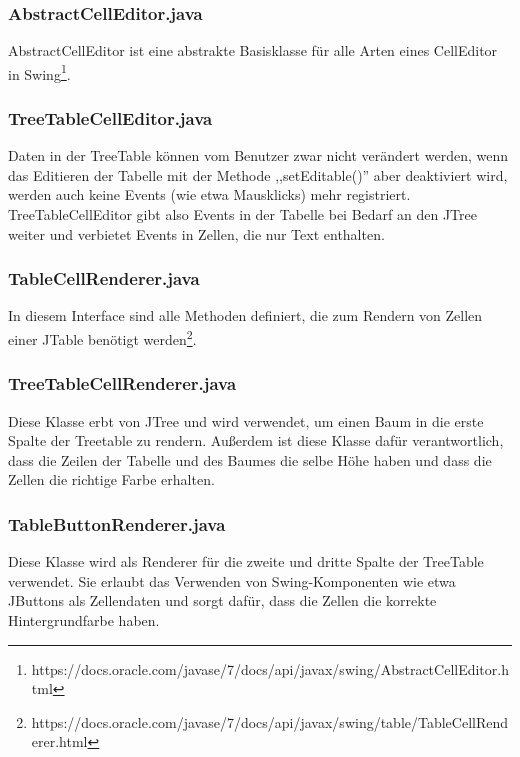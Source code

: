 \subsubsection*{AbstractCellEditor.java}
AbstractCellEditor ist eine abstrakte Basisklasse für alle Arten eines CellEditor in Swing\footnote{https://docs.oracle.com/javase/7/docs/api/javax/swing/AbstractCellEditor.html}.

\subsubsection*{TreeTableCellEditor.java}
Daten in der TreeTable können vom Benutzer zwar nicht verändert werden, wenn das Editieren der Tabelle mit der Methode ,,setEditable()'' aber deaktiviert wird, werden auch keine Events (wie etwa Mausklicks) mehr registriert. TreeTableCellEditor gibt also Events in der Tabelle bei Bedarf an den JTree weiter und verbietet Events in Zellen, die nur Text enthalten.

\subsubsection*{TableCellRenderer.java}
In diesem Interface sind alle Methoden definiert, die zum Rendern von Zellen einer JTable benötigt werden\footnote{https://docs.oracle.com/javase/7/docs/api/javax/swing/table/TableCellRenderer.html}.

\subsubsection*{TreeTableCellRenderer.java}
Diese Klasse erbt von JTree und wird verwendet, um einen Baum in die erste Spalte der Treetable zu rendern. Außerdem ist diese Klasse dafür verantwortlich, dass die Zeilen der Tabelle und des Baumes die selbe Höhe haben und dass die Zellen die richtige Farbe erhalten.

\subsubsection*{TableButtonRenderer.java}
Diese Klasse wird als Renderer für die zweite und dritte Spalte der TreeTable verwendet. Sie erlaubt das Verwenden von Swing-Komponenten wie etwa JButtons als Zellendaten und sorgt dafür, dass die Zellen die korrekte Hintergrundfarbe haben.



